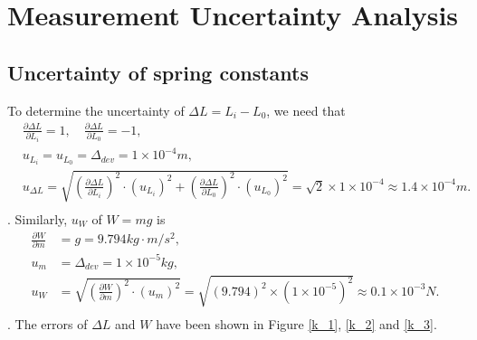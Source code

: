 \section{Measurement Uncertainty Analysis}
\subsection{Uncertainty of spring constants}
    To determine the uncertainty of $\Delta L=L_i-L_0$, we need that
    \[
    \begin{split}
        &\frac{\partial \Delta L}{\partial L_i}=1,\quad \frac{\partial \Delta L}{\partial L_0}=-1,\\
        &u_{L_i}=u_{L_0}=\Delta_{dev}=1\times10^{-4}m,\\
        &u_{\Delta L}=\sqrt{(\frac{\partial \Delta L}{\partial L_i})^2\cdot (u_{L_i})^2+(\frac{\partial \Delta L}{\partial L_0})^2\cdot (u_{L_0})^2}=\sqrt{2}\times 1\times10^{-4}\approx1.4\times10^{-4}m.\\
    \end{split}
    \].
    Similarly, $u_{W}$ of $W=mg$ is
    \[
    \begin{split}
        \frac{\partial W}{\partial m}&=g=9.794kg\cdot m/s^2,\\
        u_m&=\Delta_{dev}=1\times10^{-5}kg,\\
        u_{W}&=\sqrt{(\frac{\partial W}{\partial m})^2\cdot (u_m)^2}=\sqrt{(9.794)^2\times (1\times10^{-5})^2}\approx 0.1\times10^{-3}N.\\
    \end{split}
    \].
    The errors of $\Delta L$ and $W$ have been shown in Figure \ref{k_1}, \ref{k_2} and \ref{k_3}.
